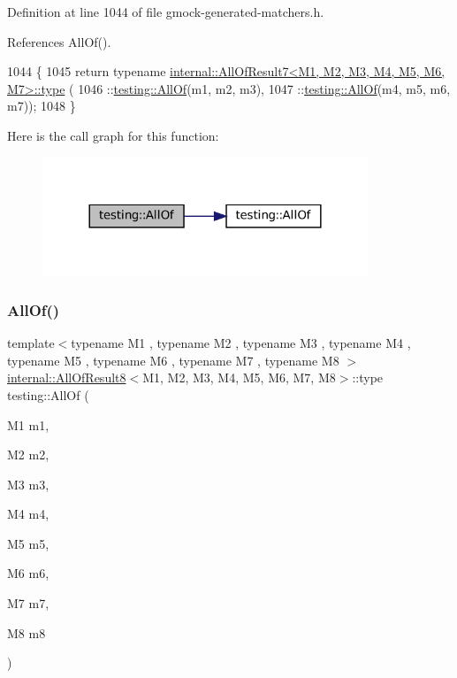 Definition at line 1044 of file gmock-\/generated-\/matchers.\+h.



References All\+Of().


\begin{DoxyCode}
1044                                                        \{
1045   \textcolor{keywordflow}{return} \textcolor{keyword}{typename} \hyperlink{namespacegenerate__debs_a50bc9a7ecac9584553e089a448bcde58}{internal::AllOfResult7<M1, M2, M3, M4, M5, M6, M7>::type}
      (
1046       ::\hyperlink{namespacetesting_af7618e8606c1cb45738163688944e2b7}{testing::AllOf}(m1, m2, m3),
1047       ::\hyperlink{namespacetesting_af7618e8606c1cb45738163688944e2b7}{testing::AllOf}(m4, m5, m6, m7));
1048 \}
\end{DoxyCode}
Here is the call graph for this function\+:
\nopagebreak
\begin{figure}[H]
\begin{center}
\leavevmode
\includegraphics[width=276pt]{namespacetesting_acbd4eef50126ff6db5b93ac5faa71b45_cgraph}
\end{center}
\end{figure}
\mbox{\label{namespacetesting_a7ec0bc4eca9805e85b9b34bbbf3d3ae2}} 
\subsubsection{\texorpdfstring{All\+Of()}{AllOf()}\hspace{0.1cm}{\footnotesize\ttfamily [7/9]}}
{\footnotesize\ttfamily template$<$typename M1 , typename M2 , typename M3 , typename M4 , typename M5 , typename M6 , typename M7 , typename M8 $>$ \\
\hyperlink{structtesting_1_1internal_1_1AllOfResult8}{internal\+::\+All\+Of\+Result8}$<$M1, M2, M3, M4, M5, M6, M7, M8$>$\+::type testing\+::\+All\+Of (\begin{DoxyParamCaption}\item[{M1}]{m1,  }\item[{M2}]{m2,  }\item[{M3}]{m3,  }\item[{M4}]{m4,  }\item[{M5}]{m5,  }\item[{M6}]{m6,  }\item[{M7}]{m7,  }\item[{M8}]{m8 }\end{DoxyParamCaption})\hspace{0.3cm}{\ttfamily [inline]}}



